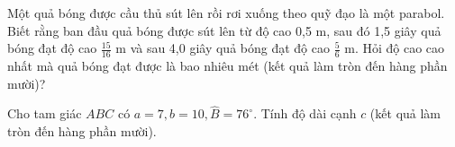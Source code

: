 \documentclass[12pt,a4paper]{article}
\begin{document}
\begin{ex}
 Một quả bóng được cầu thủ sút lên rồi rơi xuống theo quỹ đạo là một parabol. Biết rằng ban đầu quả bóng được sút lên từ độ cao 0,5 m, sau đó 1,5 giây quả bóng đạt độ cao $\frac{15}{16}$ m và sau 4,0 giây quả bóng đạt độ cao $\frac{5}{6}$ m. Hỏi độ cao cao nhất mà quả bóng đạt được là bao nhiêu mét (kết quả làm tròn đến hàng phần mười)?



\end{ex}

\begin{ex}
 Cho tam giác ${ABC}$ có $a=7,b=10, \widehat{B}=76^\circ$. Tính độ dài cạnh ${c}$ (kết quả làm tròn đến hàng phần mười).

\end{ex}
\end{document}
